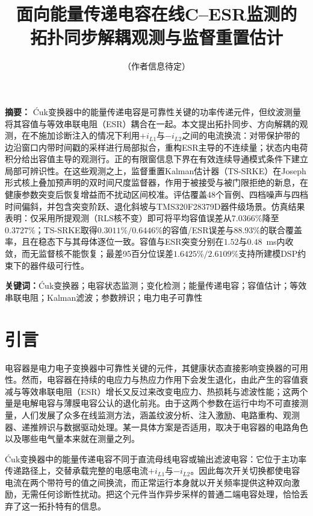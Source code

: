\documentclass[zihao=5,a4paper]{ctexart}
\title{面向\Cuk{}能量传递电容在线C--ESR监测的\\拓扑同步解耦观测与监督重置估计}
\author{（作者信息待定）}
\date{}
\DeclareRobustCommand{\Cuk}{\mbox{\'{C}uk}}
\newcommand{\TSSRKE}{TS-SRKE}
\begin{document}
\maketitle

\noindent\textbf{摘要：}
\Cuk{}变换器中的能量传递电容是可靠性关键的功率传递元件，但纹波测量将其容值与等效串联电阻（ESR）耦合在一起。本文提出拓扑同步、方向解耦的观测，在不施加诊断注入的情况下利用$+i_{L1}$与$-i_{L2}$之间的电流换流：对带保护带的边沿窗口内带时间戳的采样进行局部拟合，重构ESR主导的不连续量；状态内电荷积分给出容值主导的观测行。正的有限窗信息下界在有效连续导通模式条件下建立局部可辨识性。在这些观测之上，监督重置Kalman估计器（\TSSRKE{}）在Joseph形式核上叠加预声明的双时间尺度监督器，作用于被接受与被门限拒绝的新息，在健康参数突变后恢复增益而不扰动区间校准。评估覆盖48个盲例、四档噪声与四档时间偏斜，并包含突变阶跃、退化斜坡与TMS320F28379D器件级场景。仿真结果表明：仅采用所提观测（RLS核不变）即可将平均容值误差从$7.0366\%$降至$0.3727\%$；\TSSRKE{}取得$0.3011\%/0.6446\%$的容值/ESR误差与$88.93\%$的联合覆盖率，且在稳态下与其母体逐位一致。容值与ESR突变分别在$1.52$与$0.48$~ms内收敛，而无监督核不能恢复；最差95百分位误差$1.6425\%/2.6109\%$支持所建模DSP约束下的器件级可行性。

\vspace{0.5em}
\noindent\textbf{关键词：}\Cuk{}变换器；电容状态监测；变化检测；能量传递电容；容值估计；等效串联电阻；Kalman滤波；参数辨识；电力电子可靠性

\section{引言}
\label{sec:introduction}

电容器是电力电子变换器中可靠性关键的元件，其健康状态直接影响变换器的可用性\cite{wang2014reliability}。然而，电容器在持续的电应力与热应力作用下会发生退化，由此产生的容值衰减与等效串联电阻（ESR）增长又反过来改变电应力、热损耗与滤波性能；这两个量是电解电容与薄膜电容公认的退化前兆\cite{wang2014reliability,yao2024film}。由于这两个参数在运行中均不可直接测量，人们发展了众多在线监测方法，涵盖纹波分析、注入激励、电路重构、观测器、递推辨识与数据驱动处理\cite{dang2020review,nathan2023review,zhao2021overview}。某一具体方案是否适用，取决于电容器的电路角色以及哪些电气量本来就在测量之列。

\Cuk{}变换器中的能量传递电容不同于直流母线电容或输出滤波电容：它位于主功率传递路径上，交替承载完整的电感电流$+i_{L1}$与$-i_{L2}$。因此每次开关切换都使电容电流在两个带符号的值之间换流，而正常运行本身就以开关频率提供这种双向激励，无需任何诊断性扰动。把这个元件当作异步采样的普通二端电容处理，恰恰丢弃了这一拓扑特有的信息。
\end{document}
